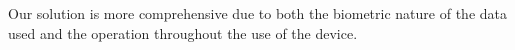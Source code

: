 Our solution is more comprehensive due to
both 
the biometric nature of the data used and
the operation throughout the use of the device.
%
%
